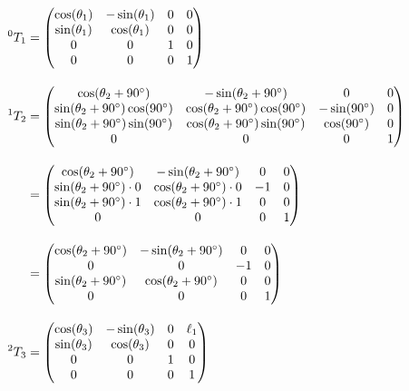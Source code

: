 \documentclass[12pt]{article}
\begin{document}
\begin{align*}
{}^{0}T_1 &= \begin{pmatrix}
\cos(\theta_1) & -\sin(\theta_1) & 0 & 0 \\
\sin(\theta_1) & \cos(\theta_1) & 0 & 0 \\
0 & 0 & 1 & 0 \\
0 & 0 & 0 & 1
\end{pmatrix} 
\\[1em]
{}^{1}T_2 &= \begin{pmatrix}
\cos(\theta_2 + 90\degree) & -\sin(\theta_2 + 90\degree) & 0 & 0 \\
\sin(\theta_2 + 90\degree)\cos(90\degree) & \cos(\theta_2 + 90\degree)\cos(90\degree) & -\sin(90\degree) & 0 \\
\sin(\theta_2 + 90\degree)\sin(90\degree) & \cos(\theta_2 + 90\degree)\sin(90\degree) & \cos(90\degree) & 0 \\
0 & 0 & 0 & 1
\end{pmatrix} \\[1em]
&= \begin{pmatrix}
\cos(\theta_2 + 90\degree) & -\sin(\theta_2 + 90\degree) & 0 & 0 \\
\sin(\theta_2 + 90\degree) \cdot 0 & \cos(\theta_2 + 90\degree) \cdot 0 & - 1 & 0 \\
\sin(\theta_2 + 90\degree) \cdot 1 & \cos(\theta_2 + 90\degree) \cdot 1 & 0 & 0 \\
0 & 0 & 0 & 1
\end{pmatrix} \\[1em]
&= \begin{pmatrix}
\cos(\theta_2 + 90\degree) & -\sin(\theta_2 + 90\degree) & 0 & 0 \\
0 & 0 & - 1 & 0 \\
\sin(\theta_2 + 90\degree) & \cos(\theta_2 + 90\degree) & 0 & 0 \\
0 & 0 & 0 & 1
\end{pmatrix} 
\\[1em]
{}^{2}T_3 &= \begin{pmatrix}
\cos(\theta_3) & -\sin(\theta_3) & 0 & \ell_1 \\
\sin(\theta_3) & \cos(\theta_3) & 0 & 0 \\
0 & 0 & 1 & 0 \\
0 & 0 & 0 & 1
\end{pmatrix}
\end{align*}
\end{document}
